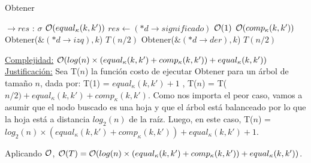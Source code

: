 \begin{Algoritmos}
\begin{algorithm}
\caption{Obtener}
\begin{algorithmic}[1]
$\to res$ : \texttt{$\sigma$}	
	\Comment $\mathcal{O}(equal_{\kappa}(k, k'))$
		\State $res\gets (*d\to significado)$
		\Comment $\mathcal{O}(1)$
	\Else
		\Comment $\mathcal{O}(comp_{\kappa}(k, k'))$
			\State Obtener($\&(*d\to izq), k$)	
			\Comment $T(n/2)$	
		\Else
			\State Obtener($\&(*d\to der), k$)
			\Comment $T(n/2)$
		\EndIf
	\EndIf

\EndProcedure
\end{algorithmic}
\underline{Complejidad:} $\mathcal{O}(log(n) \times (equal_{\kappa}(k, k') + comp_{\kappa}(k, k')) + equal_{\kappa}(k, k'))$ \\
\underline{Justificación:} Sea T($n$) la función costo de ejecutar Obtener para un árbol de tamaño $n$, dada por: T(1) = $equal_{\kappa}(k, k') + 1$ , T($n$) = T($n/2) + equal_{\kappa}(k, k') + comp_{\kappa}(k, k')$. Como nos importa el peor caso, vamos a asumir que el nodo buscado es una hoja y que el árbol está balanceado por lo que la hoja está a distancia $log_2(n)$ de la raíz. Luego, en este caso, T($n$) = $log_2(n) \times (equal_{\kappa}(k, k') + comp_{\kappa}(k, k')) + equal_{\kappa}(k, k') + 1$. 

Aplicando $\mathcal{O}$, $\mathcal{O}(T) = \mathcal{O}(log(n) \times (equal_{\kappa}(k, k') + comp_{\kappa}(k, k')) + equal_{\kappa}(k, k'))$.
\end{algorithm}


\end{Algoritmos}
